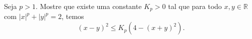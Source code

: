 Seja \(p>1\). Mostre que existe uma constante \(K_{p} >0\) tal que para todo \(x,y\in \mathbb{R}\) com \(|x|^{p}+|y|^{p}=2\), temos
\[(x-y)^{2} \leq K_{p}(4-(x+y)^{2}).\]
